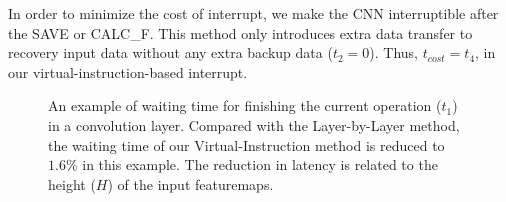 In order to minimize the cost of interrupt, we make the CNN interruptible after the SAVE or CALC\_F. This method only introduces extra data transfer to recovery input data without any extra backup data ($t_2 = 0$). Thus, $t_{cost} = t_4$, in our virtual-instruction-based interrupt.



\begin{figure}[t]
	\centering
	\vspace{-1mm} 
	\caption{ An example of waiting time for finishing the current operation ($t_1$) in a convolution layer. Compared with the Layer-by-Layer method, the waiting time of our Virtual-Instruction method is reduced to $1.6\%$ in this example. The reduction in latency is related to the height ($H$) of the input featuremaps.  }
	\label{fig:t1example}
\end{figure}



